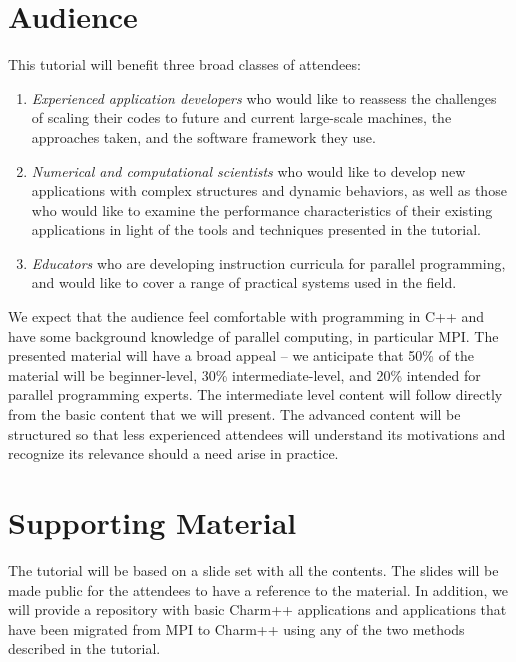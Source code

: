 \documentclass[letterpaper,10pt]{article}
\begin{document}
\section{Audience}

This tutorial will benefit three broad classes of attendees:
\vspace{-0.25cm}
\begin{enumerate}[leftmargin=*,noitemsep,label=\alph*)]
\item {\em Experienced application developers} who would like to reassess the
  challenges of scaling their codes to future and current large-scale machines,
  the approaches taken, and the software framework they use.
\item {\em Numerical and computational scientists} who would like to develop new
  applications with complex structures and dynamic behaviors, as well as those
  who would like to examine the performance characteristics of their existing
  applications in light of the tools and techniques presented in the tutorial.
\item {\em Educators} who are developing instruction curricula for parallel
  programming, and would like to cover a range of practical systems used in the
  field.
\end{enumerate}
\vspace{-0.25cm}
We expect that the audience feel comfortable with programming in C++ and
have some background knowledge of parallel computing, in particular MPI. The presented material will have a broad appeal -- we anticipate that 50\% of
the material will be beginner-level, 30\% intermediate-level, and 20\% intended
for parallel programming experts. The intermediate level content will follow
directly from the basic content that we will present. The advanced content will
be structured so that less experienced attendees will understand its
motivations and recognize its relevance should a need arise in practice.

\section{Supporting Material}
The tutorial will be based on a slide set with all the contents. The slides will be made public for the attendees to have a reference to the material. In addition, we will provide a repository with basic Charm++ applications and applications that have been migrated from MPI to Charm++ using any of the two methods described in the tutorial.
\end{document}
